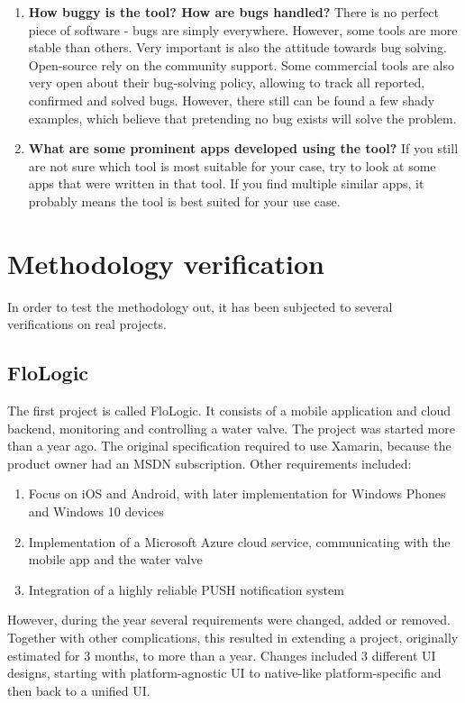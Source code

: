 \documentclass[english,master,public,dept460,male,cpdeclaration,oneside]{diploma}
\begin{document}
\begin{enumerate}
	\item \textbf{How buggy is the tool? How are bugs handled?}
	There is no perfect piece of software - bugs are simply everywhere. However, some tools are more stable than others. Very important is also the attitude towards bug solving. Open-source rely on the community support. Some commercial tools are also very open about their bug-solving policy, allowing to track all reported, confirmed and solved bugs. However, there still can be found a few shady examples, which believe that pretending no bug exists will solve the problem.
	
	\item \textbf{What are some prominent apps developed using the tool?}
	If you still are not sure which tool is most suitable for your case, try to look at some apps that were written in that tool. If you find multiple similar apps, it probably means the tool is best suited for your use case.
\end{enumerate}


\section{Methodology verification}
In order to test the methodology out, it has been subjected to several verifications on real projects. 

\subsection{FloLogic}
The first project is called FloLogic. It consists of a mobile application and cloud backend, monitoring and controlling a water valve. The project was started more than a year ago. The original specification required to use Xamarin, because the product owner had an MSDN subscription. Other requirements included:
\begin{enumerate}
	\item Focus on iOS and Android, with later implementation for Windows Phones and Windows 10 devices
	\item Implementation of a Microsoft Azure cloud service, communicating with the mobile app and the water valve
	\item Integration of a highly reliable PUSH notification system
\end{enumerate}

However, during the year several requirements were changed, added or removed. Together with other complications, this resulted in extending a project, originally estimated for 3 months, to more than a year. Changes included 3 different UI designs, starting with platform-agnostic UI to native-like platform-specific and then back to a unified UI. 
\end{document}
